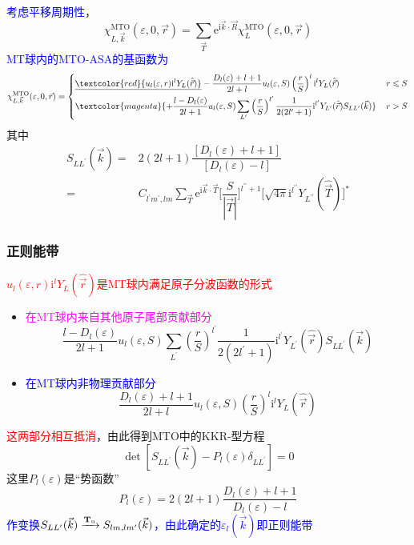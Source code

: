 {{	\textcolor{blue}{考虑平移周期性}，
$$\chi_{L,\vec k}^{\mathrm{MTO}}(\varepsilon,0,\vec r)=\sum_{\vec T}\mathrm{e}^{\mathrm{i}\vec k\cdot\vec R}\chi_L^{\mathrm{MTO}}(\varepsilon,0,\vec r)$$
\textcolor{blue}{\textrm{MT}球内的\textrm{MTO-ASA}的基函数为}
{\fontsize{7.0pt}{5.2pt}\selectfont
\begin{displaymath}
\chi_{L,\vec k}^{\mathrm{MTO}}(\varepsilon,0,\vec r)=\left\{
	\begin{aligned}
		&\underline{\textcolor{red}{u_l(\varepsilon,r)\mathrm{i}^lY_L(\hat{\vec r})}}-\dfrac{D_l(\varepsilon)+l+1}{2l+l}u_l(\varepsilon,S)\left(\dfrac rS\right)^l\mathrm{i}^lY_L(\hat{\vec r})&\, r\leqslant S\\
		&\textcolor{magenta}{+\dfrac{l-D_l(\varepsilon)}{2l+1}u_l(\varepsilon,S)\sum_{L^{\prime}}\left(\dfrac rS\right)^{l^{\prime}}\dfrac1{2(2l^{\prime}+1)}\mathrm{i}^{l^{\prime}}Y_{L^{\prime}}(\hat{\vec r})S_{LL^{\prime}}(\vec k)}&\, r>S
	\end{aligned}\right.
\end{displaymath}}
其中
\begin{displaymath}
	\begin{aligned}
		S_{LL^{\prime}}(\vec k)=&2(2l+1)\dfrac{[D_l(\varepsilon)+l+1]}{[D_l(\varepsilon)-l]}\\
		=&C_{l^{\prime}m^{\prime},lm}\sum_{\vec T}\mathrm{e}^{\mathrm{i}\vec k\cdot\vec T}\bigg[\dfrac S{|\vec T|}\bigg]^{l^{\prime\prime}+1}\big[\sqrt{4\pi}\mathrm{i}^{l^{\prime\prime}}Y_{L^{\prime\prime}}(\hat{\vec T})\big]^{\ast}
	\end{aligned}
\end{displaymath}
}

\frame
{
	\frametitle{正则能带}
	\textcolor{red}{$u_l(\varepsilon,r)\mathrm{i}^lY_L(\hat{\vec r})$是\textrm{MT}球内满足原子分波函数的形式}
	\begin{itemize}
		\item \textcolor{magenta}{在\textrm{MT}球内来自其他原子尾部贡献部分}$$\dfrac{l-D_l(\varepsilon)}{2l+1}u_l(\varepsilon,S)\sum_{L^{\prime}}\left(\dfrac rS\right)^{l^{\prime}}\dfrac1{2(2l^{\prime}+1)}\mathrm{i}^{l^{\prime}}Y_{L^{\prime}}(\hat{\vec r})S_{LL^{\prime}}(\vec k)$$
		\item \textcolor{blue}{在\textrm{MT}球内非物理贡献部分}$$\dfrac{D_l(\varepsilon)+l+1}{2l+l}u_l(\varepsilon,S)\left(\dfrac rS\right)^l\mathrm{i}^lY_L(\hat{\vec r})$$
	\end{itemize}
	\textcolor{red}{这两部分相互抵消}，由此得到\textrm{MTO}中的\textrm{KKR}-型方程
	\begin{displaymath}
		\det[S_{LL^{\prime}}(\vec k)-P_l(\varepsilon)\delta_{LL^{\prime}}]=0
	\end{displaymath}
	这里$P_l(\varepsilon)$是“势函数”
	\begin{displaymath}
		P_l(\varepsilon)=2(2l+1)\dfrac{D_l(\varepsilon)+l+1}{D_l(\varepsilon)-l}
	\end{displaymath}
	\textcolor{blue}{作变换$S_{LL^{\prime}}(\vec k)\xrightarrow{\bf{T}\rm{_u}}S_{lm,lm^{\prime}}(\vec k)$，由此确定的$\varepsilon_l(\vec k)$即正则能带}
}

}
